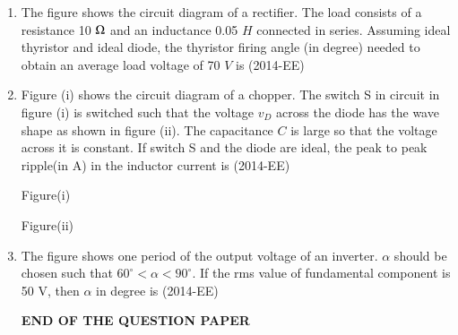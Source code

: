 \documentclass[journal,12pt,twocolumn]{IEEEtran}
\theoremstyle{remark}
\begin{document}
\begin{enumerate}[start=53]
\begin{enumerate}
\end{enumerate}

\item The figure shows the circuit diagram of a rectifier. The load consists of a resistance 10 $\ohm$ and an
inductance 0.05 $H$ connected in series. Assuming ideal thyristor and ideal diode, the thyristor
firing angle (in degree) needed to obtain an average load voltage of 70 $V$ is \underline{\hspace{2.5 cm}}  \hfill{(2014-EE)}

\begin{center}

\end{center}




\item Figure (i) shows the circuit diagram of a chopper. The switch S in circuit in figure (i) is switched such that the voltage $v_D$ across the diode has the wave shape as shown in figure (ii). The capacitance $C$ is large so that the voltage across it is constant. If switch S and the diode are ideal, the peak to peak ripple(in A) in the inductor current is  \underline{\hspace{2.5 cm}}    \hfill{(2014-EE)} 
         
\begin{center}

Figure(i)
\end{center}

\begin{center}

Figure(ii)
\end{center}


\item The figure shows one period of the output voltage of an inverter. $\alpha$ should be chosen such that $60 ^{\circ} < \alpha<90^{\circ}$. If the rms value of fundamental component is 50 V, then $\alpha$ in degree  is \underline{\hspace{2.5 cm}}  \hfill{(2014-EE)}

\begin{center}

\end{center}
\begin{center}
    \textbf{END OF THE QUESTION PAPER}
    \end{center}
\end{enumerate}
\end{document}
